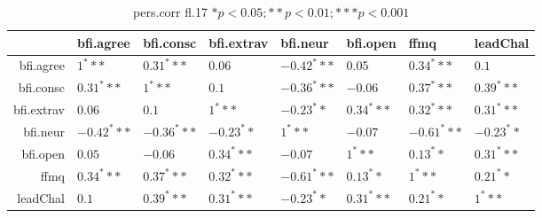 \begin{table}[ht]
\centering
\begin{tabular}{rlllllll}
  \hline
 & bfi.agree & bfi.consc & bfi.extrav & bfi.neur & bfi.open & ffmq & leadChal \\ 
  \hline
bfi.agree & $1^***$ & $0.31^***$ & $0.06$ & $-0.42^***$ & $0.05$ & $0.34^***$ & $0.1$ \\ 
  bfi.consc & $0.31^***$ & $1^***$ & $0.1$ & $-0.36^***$ & $-0.06$ & $0.37^***$ & $0.39^***$ \\ 
  bfi.extrav & $0.06$ & $0.1$ & $1^***$ & $-0.23^**$ & $0.34^***$ & $0.32^***$ & $0.31^***$ \\ 
  bfi.neur & $-0.42^***$ & $-0.36^***$ & $-0.23^**$ & $1^***$ & $-0.07$ & $-0.61^***$ & $-0.23^**$ \\ 
  bfi.open & $0.05$ & $-0.06$ & $0.34^***$ & $-0.07$ & $1^***$ & $0.13^**$ & $0.31^***$ \\ 
  ffmq & $0.34^***$ & $0.37^***$ & $0.32^***$ & $-0.61^***$ & $0.13^**$ & $1^***$ & $0.21^**$ \\ 
  leadChal & $0.1$ & $0.39^***$ & $0.31^***$ & $-0.23^**$ & $0.31^***$ & $0.21^**$ & $1^***$ \\ 
   \hline
\end{tabular}
\caption{pers.corr fl.17 $* p < 0.05; ** p < 0.01; *** p < 0.001$} 
\end{table}
